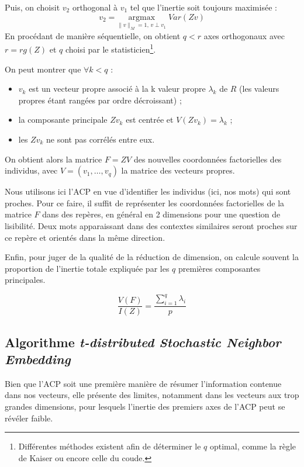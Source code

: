 \documentclass[11pt,french,french]{article}
\providecommand{\tightlist}{%
  \setlength{\parskip}{0pt}
  }
\let\rmarkdownfootnote\footnote%
\def\footnote{\protect\rmarkdownfootnote}
\begin{document}
Puis, on choisit \(v_2\) orthogonal à \(v_1\) tel que l'inertie soit toujours maximisée :
\[
v_2 =\underset{ \| v \|_M = 1,\,v \perp v_1}{\mathrm{argmax}}\;  Var(Zv)
\]
En procédant de manière séquentielle, on obtient \(q < r\) axes orthogonaux avec \(r = rg(Z)\) et \(q\) choisi par le statisticien\footnote{Différentes méthodes existent afin de déterminer le \(q\) optimal, comme la règle de Kaiser ou encore celle du coude.}.

On peut montrer que \(\forall k < q\) :

\begin{itemize}
\tightlist
\item
  \(v_k\) est un vecteur propre associé à la k\ieme{} valeur propre \(\lambda_k\) de \(R\) (les valeurs propres étant rangées par ordre décroissant) ;
\item
  la composante principale \(Zv_k\) est centrée et \(V(Zv_k)= \lambda_k\) ;
\item
  les \(Zv_k\) ne sont pas corrélés entre eux.
\end{itemize}

On obtient alors la matrice \(F = ZV\) des nouvelles coordonnées factorielles des individus, avec \(V = (v_1,\dots,v_q)\) la matrice des vecteurs propres.

Nous utilisons ici l'ACP en vue d'identifier les individus (ici, nos mots) qui sont proches. Pour ce faire, il suffit de représenter les coordonnées factorielles de la matrice \(F\) dans des repères, en général en 2 dimensions pour une question de lisibilité. Deux mots apparaissant dans des contextes similaires seront proches sur ce repère et orientés dans la même direction.

Enfin, pour juger de la qualité de la réduction de dimension, on calcule souvent la proportion de l'inertie totale expliquée par les \(q\) premières composantes principales.

\[ \frac{V(F)}{I(Z)} = \frac{\sum \limits_{i = 1}^q \lambda_i}{p}\]

\hypertarget{algorithme-t-distributed-stochastic-neighbor-embedding}{%
\subsection{\texorpdfstring{Algorithme \emph{t-distributed Stochastic Neighbor Embedding}}{Algorithme t-distributed Stochastic Neighbor Embedding}}\label{algorithme-t-distributed-stochastic-neighbor-embedding}}

Bien que l'ACP soit une première manière de résumer l'information contenue dans nos vecteurs, elle présente des limites, notamment dans les vecteurs aux trop grandes dimensions, pour lesquels l'inertie des premiers axes de l'ACP peut se révéler faible.
\end{document}
